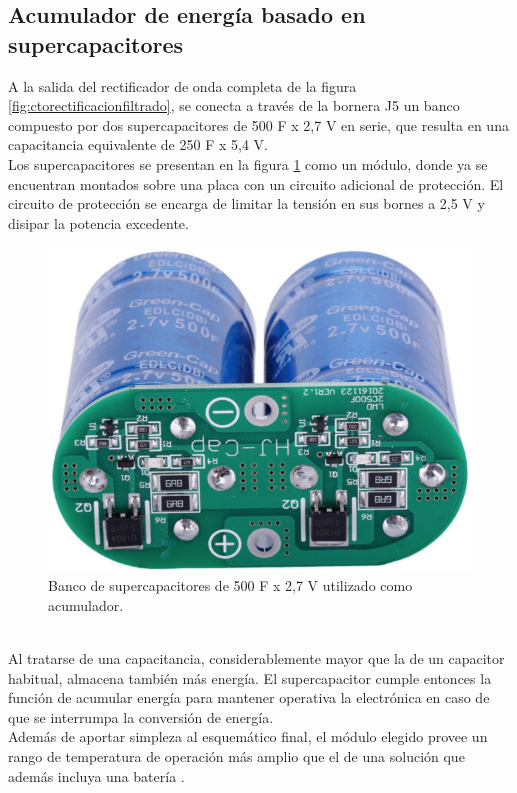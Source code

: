 \subsection{Acumulador de energía basado en supercapacitores}
A la salida del rectificador de onda completa de la figura \ref{fig:ctorectificacionfiltrado}, se conecta a través de la bornera J5 un banco compuesto por dos supercapacitores de 500 F x 2,7 V en serie, que resulta en una capacitancia equivalente de 250 F x 5,4 V.\\
Los supercapacitores se presentan en la figura \ref{fig:imagensupercap} como un módulo, donde ya se encuentran montados sobre una placa con un circuito adicional de protección. El circuito de protección se encarga de limitar la tensión en sus bornes a 2,5 V y disipar la potencia excedente.\\
\begin{figure}[h]
	\centering
	\includegraphics[width=0.5\linewidth]{Figures/imagen_supercap}
	\caption{Banco de supercapacitores de 500 F x 2,7 V utilizado como acumulador.}
	\label{fig:imagensupercap}
\end{figure}\\
Al tratarse de una capacitancia, considerablemente mayor que la de un capacitor habitual, almacena también más energía. El supercapacitor cumple entonces la función de acumular energía para mantener operativa la electrónica en caso de que se interrumpa la conversión de energía.\\
Además de aportar simpleza al esquemático final, el módulo elegido provee un rango de temperatura de operación más amplio que el de una solución que además incluya una batería \citep{PORCARELLI20141671}.\\

